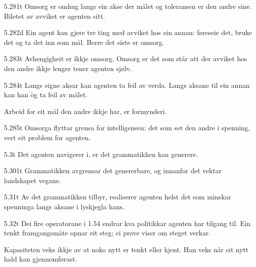 \begin{formproposition}{5.281}{t}
Omsorg er omhug langs ein akse der målet og toleransen er den andre sine. Biletet av avviket er agenten sitt.
\end{formproposition}

\begin{formproposition}{5.282}{d}
Ein agent kan gjere tre ting med avviket hos ein annan: føreseie det, bruke det og ta det inn som mål. Berre det siste er omsorg.
\end{formproposition}

\begin{formproposition}{5.283}{t}
Avhengigheit er ikkje omsorg. Omsorg er det som står att der avviket hos den andre ikkje lenger tener agenten sjølv.
\end{formproposition}

\begin{formproposition}{5.284}{t}
Langs eigne aksar kan agenten ta feil av verda. Langs aksane til ein annan kan han òg ta feil av målet.

Arbeid for eit mål den andre ikkje har, er formynderi.
\end{formproposition}

\begin{formproposition}{5.285}{t}
Omsorga flyttar grensa for intelligensen: det som set den andre i spenning, vert eit problem for agenten.
\end{formproposition}

\begin{formproposition}{5.3}{t}
Det agenten navigerer i, er det grammatikken kan generere.
\end{formproposition}

\begin{formproposition}{5.301}{t}
Grammatikken avgrensar det genererbare, og innanfor det vektar landskapet vegane.
\end{formproposition}

\begin{formproposition}{5.31}{t}
Av det grammatikken tilbyr, realiserer agenten helst det som minskar spenninga langs aksane i lyskjegla hans.
\end{formproposition}

\begin{formproposition}{5.32}{t}
Dei fire operatorane i 1.54 endrar kva politikkar agenten har tilgang til. Ein tenkt framgangsmåte opnar eit steg; ei prøve viser om steget verkar.

Kapasiteten veks ikkje av at noko nytt er tenkt eller kjent. Han veks når eit nytt hald kan gjennomførast.
\end{formproposition}

